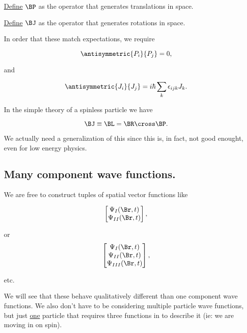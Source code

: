 \underline{Define} $\BP$ as the operator that generates translations in space.

\underline{Define} $\BJ$ as the operator that generates rotations in space.

In order that these match expectations, we require

\begin{equation}\label{eqn:qmTwoL11:490}
\antisymmetric{P_i}{P_j} = 0,
\end{equation}

and

\begin{equation}\label{eqn:qmTwoL11:510}
\antisymmetric{J_i}{J_j} = i \hbar \sum_k \epsilon_{ijk} J_k.
\end{equation}

In the simple theory of a spinless particle we have

\begin{equation}\label{eqn:qmTwoL11:530}
\BJ \equiv \BL = \BR \cross \BP.
\end{equation}

We actually need a generalization of this since this is, in fact, not good enought, even for low energy physics.

\subsection{Many component wave functions.}

We are free to construct tuples of spatial vector functions like

\begin{equation}\label{eqn:qmTwoL11:550}
\begin{bmatrix}
\Psi_I(\Br, t) \\
\Psi_{II}(\Br, t)
\end{bmatrix},
\end{equation}

or
\begin{equation}\label{eqn:qmTwoL11:570}
\begin{bmatrix}
\Psi_I(\Br, t) \\
\Psi_{II}(\Br, t) \\
\Psi_{III}(\Br, t)
\end{bmatrix},
\end{equation}

etc.

We will see that these behave qualitatively different than one component wave functions.  We also don't have to be considering multiple particle wave functions, but just \underline{one} particle that requires three functions in  to describe it (ie: we are moving in on spin).

